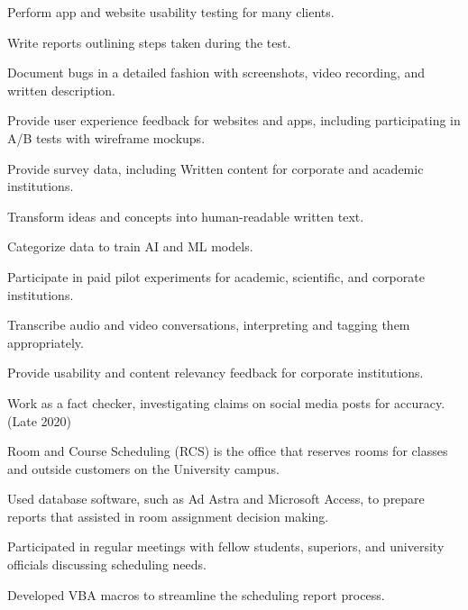\documentclass[]{deedy-resume-openfont}
\begin{document}
\begin{tightemize}
\item Perform app and website usability testing for many clients.
\item Write reports outlining steps taken during the test.
\item Document bugs in a detailed fashion with screenshots, video recording, and written description.
\end{tightemize}
\sectionsep

\begin{tightemize}
\item Provide user experience feedback for websites and apps, including participating in A/B tests with wireframe mockups.
\item Provide survey data, including Written content for corporate and academic institutions.
\item Transform ideas and concepts into human-readable written text.
\item Categorize data to train AI and ML models.
\item Participate in paid pilot experiments for academic, scientific, and corporate institutions.
\item Transcribe audio and video conversations, interpreting and tagging them appropriately.
\end{tightemize}
\sectionsep

\begin{tightemize}
\item Provide usability and content relevancy feedback for corporate institutions.
\item Work as a fact checker, investigating claims on social media posts for accuracy. (Late 2020)
\end{tightemize}
\sectionsep

\begin{tightemize}
\item Room and Course Scheduling (RCS) is the office that reserves rooms for classes and outside customers on the University campus.
\item Used database software, such as Ad Astra and Microsoft Access, to prepare reports that assisted in room assignment decision making.
\item Participated in regular meetings with fellow students, superiors, and university officials discussing scheduling needs.
\item Developed VBA macros to streamline the scheduling report process.
\end{tightemize}
\sectionsep
\end{document}

